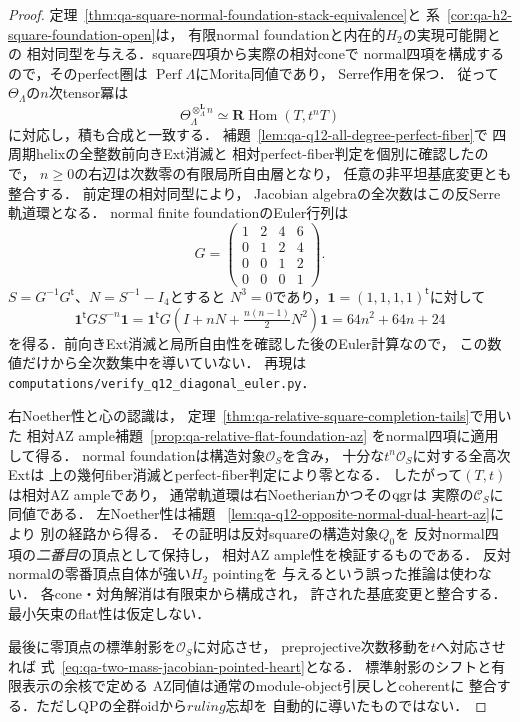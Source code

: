\begin{proof}
定理~\ref{thm:qa-square-normal-foundation-stack-equivalence}と
系~\ref{cor:qa-h2-square-foundation-open}は，
有限normal foundationと内在的$H_2$の実現可能開との
相対同型を与える．square四項から実際の相対coneで
normal四項を構成するので，そのperfect圏は
$\operatorname{Perf}\Lambda$にMorita同値であり，
Serre作用を保つ．
従って$\Theta_\Lambda$の$n$次tensor冪は
\[
 \Theta_\Lambda^{\otimes_\Lambda^{\mathbf L}n}
 \simeq\mathbf R\operatorname{Hom}(T,t^nT)
\]
に対応し，積も合成と一致する．
補題~\ref{lem:qa-q12-all-degree-perfect-fiber}で
四周期helixの全整数前向きExt消滅と
相対perfect-fiber判定を個別に確認したので，
$n\ge0$の右辺は次数零の有限局所自由層となり，
任意の非平坦基底変更とも整合する．
前定理の相対同型により，
Jacobian algebraの全次数はこの反Serre軌道環となる．
normal finite foundationのEuler行列は
\[
 G=\begin{pmatrix}
1&2&4&6\\0&1&2&4\\0&0&1&2\\0&0&0&1
\end{pmatrix}.
\]
$S=G^{-1}G^{\mathsf t}$、$N=S^{-1}-I_4$とすると
$N^3=0$であり，$\boldsymbol 1=(1,1,1,1)^{\mathsf t}$に対して
\[
 \boldsymbol1^{\mathsf t}GS^{-n}\boldsymbol1
 =\boldsymbol1^{\mathsf t}G
 (I+nN+\tfrac{n(n-1)}2N^2)\boldsymbol1
 =64n^2+64n+24
\]
を得る．前向きExt消滅と局所自由性を確認した後のEuler計算なので，
この数値だけから全次数集中を導いていない．
再現は\texttt{computations/verify\_q12\_diagonal\_euler.py}．

右Noether性と心の認識は，
定理~\ref{thm:qa-relative-square-completion-tails}で用いた
相対AZ ample補題~\ref{prop:qa-relative-flat-foundation-az}
をnormal四項に適用して得る．
normal foundationは構造対象$\mathcal O_S$を含み，
十分な$t^n\mathcal O_S$に対する全高次Extは
上の幾何fiber消滅とperfect-fiber判定により零となる．
したがって$(T,t)$は相対AZ ampleであり，
通常軌道環は右Noetherianかつその$\operatorname{qgr}$は
実際の$\mathcal C_S$に同値である．
左Noether性は補題~
\ref{lem:qa-q12-opposite-normal-dual-heart-az}により
別の経路から得る．
その証明は反対squareの構造対象$Q_0$を
反対normal四項の\emph{二番目}の頂点として保持し，
相対AZ ample性を検証するものである．
反対normalの零番頂点自体が強い$H_2$ pointingを
与えるという誤った推論は使わない．
各cone・対角解消は有限束から構成され，
許された基底変更と整合する．
最小矢束のflat性は仮定しない．

最後に零頂点の標準射影を$\mathcal O_S$に対応させ，
preprojective次数移動を$t$へ対応させれば
式~\eqref{eq:qa-two-mass-jacobian-pointed-heart}となる．
標準射影のシフトと有限表示の余核で定める
AZ同値は通常のmodule-object引戻しとcoherentに
整合する．ただしQPの全群oidから$ruling$忘却を
自動的に導いたものではない．
\end{proof}


